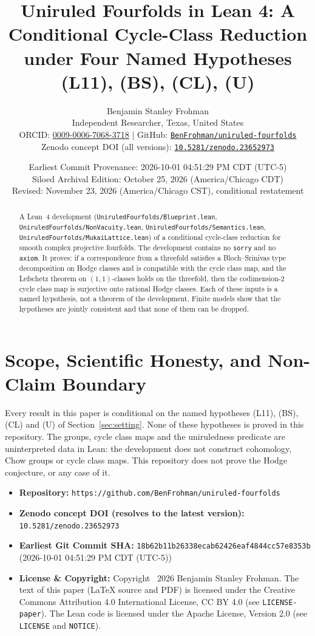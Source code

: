 \documentclass[11pt,a4paper]{article}
\title{\textbf{Uniruled Fourfolds in Lean 4: A Conditional Cycle-Class Reduction under Four Named Hypotheses (L11), (BS), (CL), (U)}}
\author{Benjamin Stanley Frohman\\
\small Independent Researcher, Texas, United States\\
\small ORCID: \href{https://orcid.org/0009-0006-7068-3718}{0009-0006-7068-3718} \quad|\quad
GitHub: \href{https://github.com/BenFrohman/uniruled-fourfolds}{\texttt{BenFrohman/uniruled-fourfolds}}\\
\small Zenodo concept DOI (all versions): \href{https://doi.org/10.5281/zenodo.23652973}{\texttt{10.5281/zenodo.23652973}}}
\date{Earliest Commit Provenance: 2026-10-01 04:51:29 PM CDT (UTC-5)\\
Siloed Archival Edition: October 25, 2026 (America/Chicago CDT)\\
Revised: November 23, 2026 (America/Chicago CST), conditional restatement}
\theoremstyle{definition}
\begin{document}
\maketitle

\begin{abstract}
A Lean~4 development (\texttt{UniruledFourfolds/\allowbreak Blueprint.lean}, \texttt{UniruledFourfolds/\allowbreak NonVacuity.lean}, \texttt{UniruledFourfolds/\allowbreak Semantics.lean}, \texttt{UniruledFourfolds/\allowbreak MukaiLattice.lean}) of a conditional cycle-class reduction for smooth complex projective fourfolds. The development contains no \texttt{sorry} and no \texttt{axiom}. It proves: if a correspondence from a threefold satisfies a Bloch--Srinivas type decomposition on Hodge classes and is compatible with the cycle class map, and the Lefschetz theorem on $(1,1)$-classes holds on the threefold, then the codimension-2 cycle class map is surjective onto rational Hodge classes. Each of these inputs is a named hypothesis, not a theorem of the development. Finite models show that the hypotheses are jointly consistent and that none of them can be dropped.
\end{abstract}

\section{Scope, Scientific Honesty, and Non-Claim Boundary}
Every result in this paper is conditional on the named hypotheses (L11), (BS), (CL) and (U) of Section~\ref{sec:setting}. None of these hypotheses is proved in this repository. The groups, cycle class maps and the uniruledness predicate are uninterpreted data in Lean: the development does not construct cohomology, Chow groups or cycle class maps. This repository does not prove the Hodge conjecture, or any case of it.

\begin{itemize}
  \item \textbf{Repository:} \texttt{https://github.com/BenFrohman/uniruled-fourfolds}
  \item \textbf{Zenodo concept DOI (resolves to the latest version):} \texttt{10.5281/zenodo.23652973}
  \item \textbf{Earliest Git Commit SHA:} \texttt{18b62b11b26338ecab62426eaf4844cc57e8353b} (2026-10-01 04:51:29 PM CDT (UTC-5))
  \item \textbf{License \& Copyright:} Copyright \textcopyright\ 2026 Benjamin Stanley Frohman. The text of this paper (LaTeX source and PDF) is licensed under the Creative Commons Attribution 4.0 International License, CC BY 4.0 (see \texttt{LICENSE-paper}). The Lean code is licensed under the Apache License, Version 2.0 (see \texttt{LICENSE} and \texttt{NOTICE}).
\end{itemize}
\end{document}
